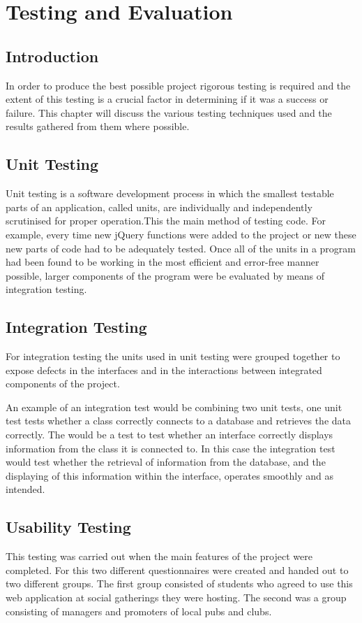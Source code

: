 \documentclass[a4paper, 12pt]{report}
\begin{document}
\chapter{Testing and Evaluation}

\section{Introduction}
In order to produce the best possible project rigorous testing is required and the extent of this testing is a crucial factor in determining if it was a success or failure. This chapter will discuss the various testing techniques used and the results gathered from them where possible. 

\section{Unit Testing}
Unit testing is a software development process in which the smallest testable parts of an application, called units, are individually and independently scrutinised for proper operation\cite{unit-testing}.This the main method of testing code.  For example, every time new jQuery functions were added to the project or new  these new parts of code had to be adequately tested. Once all of the units in a program had been found to be working in the most efficient and error-free manner possible, larger components of the program were be evaluated by means of integration testing.

\section{Integration Testing}
For integration testing the units used in unit testing were grouped together to expose defects in the interfaces and in the interactions between integrated components of the project. 

An example of an integration test would be combining two unit tests, one unit test tests whether a class correctly connects to a database and retrieves the data correctly. The would be a test to test whether an interface correctly displays information from the class it is connected to. In this case the integration test would test whether the retrieval of information from the database, and the displaying of this information within the interface, operates smoothly and as intended.

\section{Usability Testing}
This testing was carried out when the main features of the project were completed. For this two different questionnaires were created and handed out to two different groups. The first group consisted of students who agreed to use this web application at social gatherings they were hosting. The second was a group consisting of managers and promoters of local pubs and clubs. 
\end{document}
